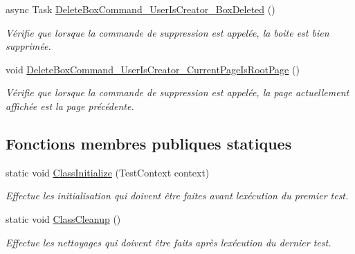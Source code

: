 \begin{DoxyCompactItemize}
async Task \hyperlink{class_boxes_1_1_tests_1_1_box_view_model_tests_ae8c8c354b08b87f88851135931073a38}{Delete\+Box\+Command\+\_\+\+User\+Is\+Creator\+\_\+\+Box\+Deleted} ()
\begin{DoxyCompactList}\small\item\em Vérifie que lorsque la commande de suppression est appelée, la boite est bien supprimée. \end{DoxyCompactList}\item 
void \hyperlink{class_boxes_1_1_tests_1_1_box_view_model_tests_a1d4c1b2de83319d31d50bdc9009481c7}{Delete\+Box\+Command\+\_\+\+User\+Is\+Creator\+\_\+\+Current\+Page\+Is\+Root\+Page} ()
\begin{DoxyCompactList}\small\item\em Vérifie que lorsque la commande de suppression est appelée, la page actuellement affichée est la page précédente. \end{DoxyCompactList}\end{DoxyCompactItemize}
\subsection*{Fonctions membres publiques statiques}
\begin{DoxyCompactItemize}
\item 
static void \hyperlink{class_boxes_1_1_tests_1_1_box_view_model_tests_add83da1c10eae5053a4d42da70a790dc}{Class\+Initialize} (Test\+Context context)
\begin{DoxyCompactList}\small\item\em Effectue les initialisation qui doivent être faites avant l\textquotesingle{}exécution du premier test. \end{DoxyCompactList}\item 
static void \hyperlink{class_boxes_1_1_tests_1_1_box_view_model_tests_a444b18fec69689fe0066151b0b60e283}{Class\+Cleanup} ()
\begin{DoxyCompactList}\small\item\em Effectue les nettoyages qui doivent être faits après l\textquotesingle{}exécution du dernier test. \end{DoxyCompactList}\end{DoxyCompactItemize}
